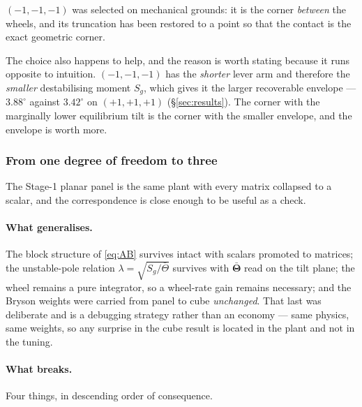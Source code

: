$(-1,-1,-1)$ was selected on mechanical grounds: it is the corner
\emph{between} the wheels, and its truncation has been restored to a point so
that the contact is the exact geometric corner.

The choice also happens to help, and the reason is worth stating because it
runs opposite to intuition. $(-1,-1,-1)$ has the \emph{shorter} lever arm and
therefore the \emph{smaller} destabilising moment $S_g$, which gives it the
larger recoverable envelope --- $3.88^\circ$ against $3.42^\circ$ on
$(+1,+1,+1)$ (\S\ref{sec:results}). The corner with the marginally lower
equilibrium tilt is the corner with the smaller envelope, and the envelope is
worth more.

\subsubsection{From one degree of freedom to three}
\label{sec:panel-to-cube}

The Stage-1 planar panel is the same plant with every matrix collapsed to a
scalar, and the correspondence is close enough to be useful as a check.

\paragraph{What generalises.} The block structure of \eqref{eq:AB} survives
intact with scalars promoted to matrices; the unstable-pole relation
$\lambda = \sqrt{S_g/\bar\Theta}$ survives with $\bar{\bm{\Theta}}$ read on
the tilt plane; the wheel remains a pure integrator, so a wheel-rate gain
remains necessary; and the Bryson weights were carried from panel to cube
\emph{unchanged}. That last was deliberate and is a debugging strategy rather
than an economy --- same physics, same weights, so any surprise in the cube
result is located in the plant and not in the tuning.

\paragraph{What breaks.} Four things, in descending order of consequence.

